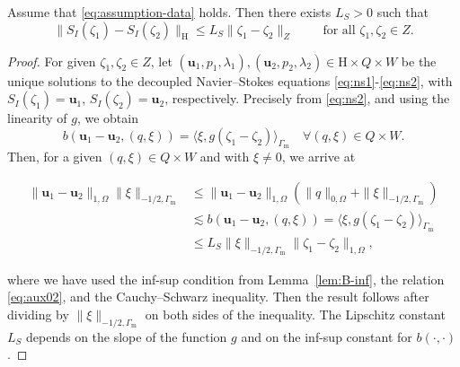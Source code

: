 \documentclass[onefignum,onetabnum,reqno,a4paper,final]{siamart250211}
\newcommand\bu{\boldsymbol{u}}
\newcommand\0{\mathbf{0}}
\newcommand\bH{\boldsymbol{\mathrm{H}}}
\newcommand\Gm{\Gamma_{\mathrm{m}}}
\numberwithin{figure}{section}
\numberwithin{table}{section}
\begin{document}
	\begin{lemma}\label{lem:S-lip}
		Assume that \eqref{eq:assumption-data} holds. Then there exists $L_S>0$ such that
		\[\| S_I(\zeta_1)-S_I(\zeta_2)\|_{\bH} \leq L_S \|\zeta_1 - \zeta_2\|_{Z} \qquad \text{ for all $\zeta_1,\zeta_2\in Z$}. \]
	\end{lemma}
	\begin{proof}
		For given $\zeta_1,\zeta_2\in Z$, let $(\bu_1,p_1,\lambda_1), (\bu_2,p_2,\lambda_2) \in \bH\times Q \times W$ be the unique solutions to the decoupled Navier--Stokes equations \eqref{eq:ns1}-\eqref{eq:ns2}, with $S_I(\zeta_1)= \bu_1$, $S_I(\zeta_2) = \bu_2$, respectively. Precisely from \eqref{eq:ns2}, and using the linearity of $g$, we obtain 
		\begin{equation}
			\label{eq:aux02}
			b(\bu_1-\bu_2,(q,\xi))  = \langle \xi, g(\zeta_1-\zeta_2) \rangle_{\Gm} \quad \forall (q,\xi)\in Q\times W.\end{equation} 
		Then, for a given $(q,\xi)\in Q\times W$ and with $\xi \neq 0$, we arrive at 
		\begin{linenomath}
			\begin{align*}
				\|\bu_1-\bu_2\|_{1,\Omega}\|\xi\|_{-1/2,\Gm} & \leq   \|\bu_1-\bu_2\|_{1,\Omega}(\|q\|_{0,\Omega} + \|\xi\|_{-1/2,\Gm})\\
				& \lesssim b(\bu_1-\bu_2,(q,\xi)) 
				 = \langle \xi, g(\zeta_1-\zeta_2) \rangle_{\Gm} \\
				& \leq L_S \|\xi\|_{-1/2,\Gm} \|\zeta_1-\zeta_2\|_{1,\Omega},
			\end{align*}
		\end{linenomath}
		where we have used the inf-sup condition from Lemma~\ref{lem:B-inf}, the relation \eqref{eq:aux02}, and the Cauchy--Schwarz inequality. Then the result follows after dividing by $\|\xi\|_{-1/2,\Gm}$ on both sides of the inequality. The Lipschitz constant $L_S$ depends on the slope of the function $g$ and on the inf-sup constant for $b(\cdot,\cdot)$. 
	\end{proof}
	
\end{document}
